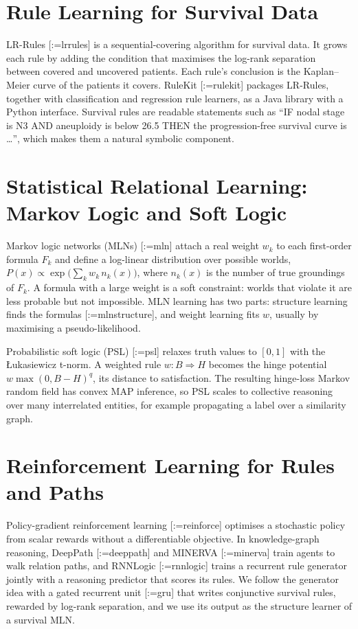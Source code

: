 \documentclass{mnnit}
\makeatletter
\newcommand{\rc}[1]{[\def\rc@sep{}\@for\rc@key:=#1\do{\rc@sep\ref{ref:\rc@key}\def\rc@sep{, }}]}
\makeatother
\begin{document}
\section{Rule Learning for Survival Data}
LR-Rules \rc{lrrules} is a sequential-covering algorithm for survival data. It grows each rule by adding the
condition that maximises the log-rank separation between covered and uncovered patients. Each rule's conclusion is
the Kaplan--Meier curve of the patients it covers. RuleKit \rc{rulekit} packages LR-Rules, together with
classification and regression rule learners, as a Java library with a Python interface. Survival rules are
readable statements such as ``IF nodal stage is N3 AND aneuploidy is below 26.5 THEN the progression-free survival
curve is \ldots'', which makes them a natural symbolic component.

\section{Statistical Relational Learning: Markov Logic and Soft Logic}
Markov logic networks (MLNs) \rc{mln} attach a real weight $w_k$ to each first-order formula $F_k$ and define a
log-linear distribution over possible worlds, $P(x) \propto \exp\big(\sum_k w_k\, n_k(x)\big)$, where $n_k(x)$ is
the number of true groundings of $F_k$. A formula with a large weight is a soft constraint: worlds that violate it
are less probable but not impossible. MLN learning has two parts: structure learning finds the formulas
\rc{mlnstructure}, and weight learning fits $w$, usually by maximising a pseudo-likelihood.

Probabilistic soft logic (PSL) \rc{psl} relaxes truth values to $[0,1]$ with the {\L}ukasiewicz t-norm. A weighted
rule $w: B \Rightarrow H$ becomes the hinge potential $w \max(0, B - H)^q$, its distance to satisfaction. The resulting
hinge-loss Markov random field has convex MAP inference, so PSL scales to collective reasoning over many
interrelated entities, for example propagating a label over a similarity graph.

\section{Reinforcement Learning for Rules and Paths}
Policy-gradient reinforcement learning \rc{reinforce} optimises a stochastic policy from scalar rewards without a
differentiable objective. In knowledge-graph reasoning, DeepPath \rc{deeppath} and MINERVA \rc{minerva} train
agents to walk relation paths, and RNNLogic \rc{rnnlogic} trains a recurrent rule generator jointly with a
reasoning predictor that scores its rules. We follow the generator idea with a gated recurrent unit \rc{gru} that
writes conjunctive survival rules, rewarded by log-rank separation, and we use its output as the structure learner
of a survival MLN.
\end{document}
